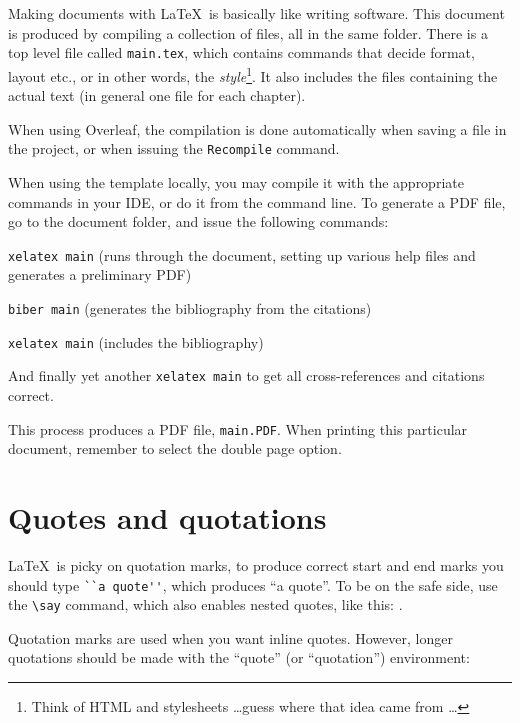 Making documents with \LaTeX\ is basically like writing software. 
This document is produced by compiling a collection of files, all in the same folder.
There is a top level file called 
\texttt{main.tex}, which contains commands that decide format, layout etc., or in other words, the {\em style}\footnote{Think of HTML and stylesheets \dots guess where that idea came from \dots}. It also includes the files containing the actual text (in general one file for each chapter).

When using Overleaf, the compilation is done automatically when saving a file in the project, or when issuing the \texttt{Recompile} command.


When using the template locally, you may compile it with the appropriate commands in your IDE, or do it from the command line. To generate a PDF file, go to the document folder, and issue the following commands: 

\begin{compactenum}
\item \verb|xelatex main| (runs through the document, setting up various help files and generates a preliminary PDF)
\item \verb|biber main| (generates the bibliography from the citations)
\item \verb|xelatex main| (includes the bibliography)
\item And finally yet another \verb|xelatex main| to get all cross-references and citations correct.
\end{compactenum}


This process produces a PDF file,
\texttt{main.PDF}. When printing this particular document, remember to select the double page option.

\section{Quotes and quotations}

\LaTeX\ is picky on quotation marks, to produce correct start and end marks you should type \verb|``a quote''|, which produces ``a quote''. To be on the safe side, use the \verb|\say| command, which also enables nested quotes, like this: .

Quotation marks are used when you want inline quotes. However, longer quotations should be made with the ``quote'' (or ``quotation'') environment:
\begin{quote} 
    \lipsum[3-4]
\end{quote}

